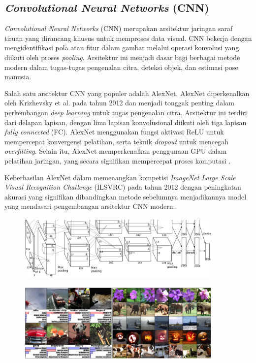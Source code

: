 \subsection{\textit{Convolutional Neural Networks} (CNN)}
\textit{Convolutional Neural Networks} (CNN) merupakan arsitektur jaringan saraf tiruan yang dirancang khusus untuk memproses data visual. CNN bekerja dengan mengidentifikasi pola atau fitur dalam gambar melalui operasi konvolusi yang diikuti oleh proses \textit{pooling}. Arsitektur ini menjadi dasar bagi berbagai metode modern dalam tugas-tugas pengenalan citra, deteksi objek, dan estimasi pose manusia.

Salah satu arsitektur CNN yang populer adalah AlexNet. AlexNet diperkenalkan oleh Krizhevsky et al. pada tahun 2012 dan menjadi tonggak penting dalam perkembangan \textit{deep learning} untuk tugas pengenalan citra. Arsitektur ini terdiri dari delapan lapisan, dengan lima lapisan konvolusional diikuti oleh tiga lapisan \textit{fully connected} (FC). AlexNet menggunakan fungsi aktivasi ReLU untuk mempercepat konvergensi pelatihan, serta teknik \textit{dropout} untuk mencegah \textit{overfitting}. Selain itu, AlexNet memperkenalkan penggunaan GPU dalam pelatihan jaringan, yang secara signifikan mempercepat proses komputasi \cite{NIPS2012_c399862d}. 

Keberhasilan AlexNet dalam memenangkan kompetisi \textit{ImageNet Large Scale Visual Recognition Challenge} (ILSVRC) pada tahun 2012 dengan peningkatan akurasi yang signifikan dibandingkan metode sebelumnya menjadikannya model yang mendasari pengembangan arsitektur CNN modern.


\begin{figure}[h!]
    \centering
    \includegraphics[width=0.9\textwidth]{images/alexnet_architecture.png}
    \label{fig:alexnet_architecture}
\end{figure}

\begin{figure}[h!]
    \centering
    \includegraphics[width=0.9\textwidth]{images/alexnet_result.png}
    \label{fig:alexnet_result}
\end{figure}

